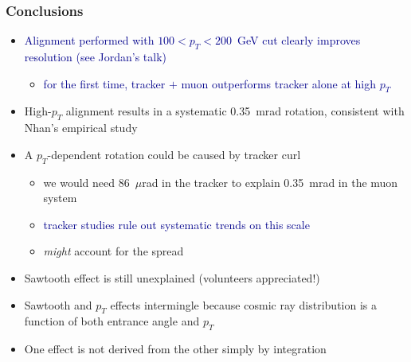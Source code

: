 \documentclass[compress]{beamer}
\begin{document}
\begin{frame}
\frametitle{Conclusions}

\begin{itemize}\setlength{\itemsep}{0.2 cm}
\item \textcolor{darkblue}{Alignment performed with $100 < p_T < 200$~GeV cut clearly improves resolution (see Jordan's talk)}
\begin{itemize}
\item \textcolor{darkblue}{for the first time, tracker $+$ muon outperforms tracker alone at high $p_T$}
\end{itemize}

\item High-$p_T$ alignment results in a systematic 0.35~mrad rotation, consistent with Nhan's empirical study

\item A $p_T$-dependent rotation could be caused by tracker curl
\begin{itemize}\setlength{\itemsep}{0.1 cm}
\item we would need 86~$\mu$rad in the tracker to explain 0.35~mrad in the muon system
\item \textcolor{darkblue}{tracker studies rule out systematic trends on this scale}
\item {\it might} account for the spread
\end{itemize}

\item Sawtooth effect is still unexplained (volunteers appreciated!)

\item Sawtooth and $p_T$ effects intermingle because cosmic ray
  distribution is a function of both entrance angle and $p_T$

\item One effect is not derived from the other simply by integration
\end{itemize}

\label{numpages}
\end{frame}
\end{document}
